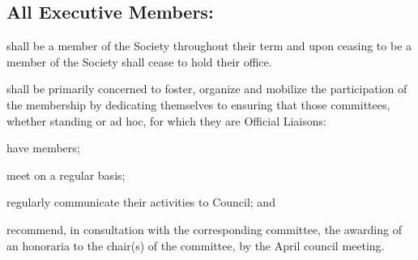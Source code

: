 \subsection [The Executive (General)]{All Executive Members:}
\begin{longenum}[ label*=\thesubsection.\arabic*., align=left]
	\item shall be a member of the Society throughout their term and upon ceasing to be a member of the Society shall cease to hold their office.
    \item shall be primarily concerned to foster, organize and mobilize the participation of the membership by dedicating themselves to ensuring that those committees, whether standing  or ad hoc, for which they are Official Liaisons:
   \begin{longenum}[ label*=\arabic*., align=left]
		\item have members;
   		\item meet on a regular basis;
        \item regularly communicate their activities to Council; and
   		\item recommend, in consultation with the corresponding committee, the awarding of an honoraria to the chair(s) of the committee, by the April council meeting.  
   		
	\end{longenum}
	

\end{longenum}
